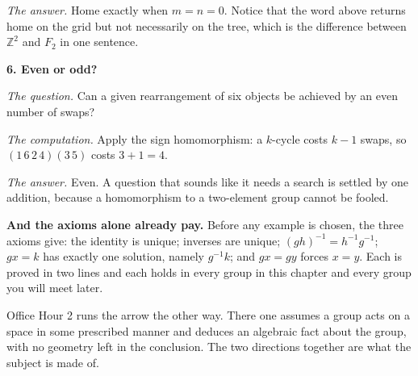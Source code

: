 \documentclass[10pt]{article}
\newcommand{\Z}{\mathbb{Z}}
\newcommand{\inv}{^{-1}}
\begin{document}
{\begin{minipage}[t]{744pt}
\begin{minipage}[t]{360pt}
\emph{The answer.} Home exactly when $m=n=0$. Notice that the word above returns home on the grid but not necessarily on the tree, which is the difference between $\Z^2$ and $F_2$ in one sentence.\par\vspace{4pt}
{\sffamily\bfseries\color{big} 6. Even or odd?}\par\vspace{1pt}
\emph{The question.} Can a given rearrangement of six objects be achieved by an even number of swaps?\par
\emph{The computation.} Apply the sign homomorphism: a $k$-cycle costs $k-1$ swaps, so $(1\,6\,2\,4)(3\,5)$ costs $3+1=4$.\par
\emph{The answer.} Even. A question that sounds like it needs a search is settled by one addition, because a homomorphism to a two-element group cannot be fooled.\par\vspace{2pt}
\begin{bigpic}
\textbf{And the axioms alone already pay.} Before any example is chosen, the three axioms give: the identity is unique; inverses are unique; $(gh)\inv=h\inv g\inv$; $gx=k$ has exactly one solution, namely $g\inv k$; and $gx=gy$ forces $x=y$. Each is proved in two lines and each holds in every group in this chapter and every group you will meet later.
\end{bigpic}
\begin{lookahead}
Office Hour 2 runs the arrow the other way. There one assumes a group acts on a space in some prescribed manner and deduces an algebraic fact about the group, with no geometry left in the conclusion. The two directions together are what the subject is made of.
\end{lookahead}
\end{minipage}
\end{minipage}
}
\end{document}
